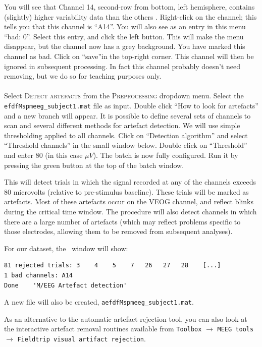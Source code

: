 You will see that Channel 14, second-row from bottom, left hemisphere, contains (slightly) higher variability data than the others .
Right-click on the channel; this tells you that this channel is ``A14''. You will also see as an entry in this menu ``bad: 0''. Select this entry, and click the left button. This will make the menu disappear, but the channel now has a grey background. You have marked this channel as bad. Click on ``save''in the top-right corner. This channel will then be ignored in subsequent processing. In fact this channel probably doesn't need removing, but we do so for teaching purposes only.
\\
\\
Select \textsc{Detect artefacts} from the \textsc{Preprocessing} dropdown menu. Select the \texttt{efdfMspmeeg\_subject1.mat} file as input.  Double click ``How to look for artefacts'' and a new branch will appear. It is possible to define several sets of channels to scan and several different methods for artefact detection. We will use simple thresholding applied to all channels. Click on ``Detection algorithm'' and select ``Threshold channels'' in the small window below. Double click on ``Threshold'' and enter 80 (in this case $\mu V$). The batch is now fully configured. Run it by pressing the green button at the top of the batch window.

This will detect trials in which the signal recorded at any of the channels exceeds 80 microvolts (relative to pre-stimulus baseline). These trials will be marked as artefacts. Most of these artefacts occur on the VEOG channel, and reflect blinks during the critical time window. The procedure will also detect channels in which there are a large number of artefacts (which may reflect problems specific to those electrodes, allowing them to be removed from subsequent analyses).

For our dataset, the \matlab\ window will show:
\begin{verbatim}
81 rejected trials: 3    4    5    7   26   27   28    [...]
1 bad channels: A14
Done    'M/EEG Artefact detection'
\end{verbatim}
A new file will also be created, \texttt{aefdfMspmeeg\_subject1.mat}.

As an alternative to the automatic artefact rejection tool, you can also look at the interactive artefact removal routines available from \texttt{Toolbox} $\rightarrow$ \texttt{MEEG tools} $\rightarrow$  \texttt{Fieldtrip visual artifact rejection}.

